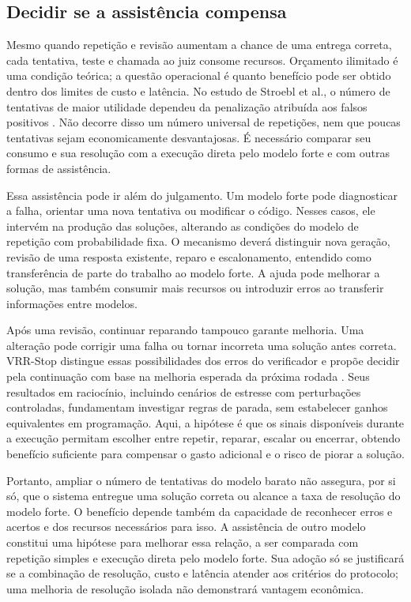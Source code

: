 \subsection{Decidir se a assistência compensa}

Mesmo quando repetição e revisão aumentam a chance de uma entrega correta, cada tentativa, teste e chamada ao juiz consome recursos. Orçamento ilimitado é uma condição teórica; a questão operacional é quanto benefício pode ser obtido dentro dos limites de custo e latência. No estudo de Stroebl et al., o número de tentativas de maior utilidade dependeu da penalização atribuída aos falsos positivos \cite{Stroebl2026Resampling}. Não decorre disso um número universal de repetições, nem que poucas tentativas sejam economicamente desvantajosas. É necessário comparar seu consumo e sua resolução com a execução direta pelo modelo forte e com outras formas de assistência.

Essa assistência pode ir além do julgamento. Um modelo forte pode diagnosticar a falha, orientar uma nova tentativa ou modificar o código. Nesses casos, ele intervém na produção das soluções, alterando as condições do modelo de repetição com probabilidade fixa. O mecanismo deverá distinguir nova geração, revisão de uma resposta existente, reparo e escalonamento, entendido como transferência de parte do trabalho ao modelo forte. A ajuda pode melhorar a solução, mas também consumir mais recursos ou introduzir erros ao transferir informações entre modelos.

Após uma revisão, continuar reparando tampouco garante melhoria. Uma alteração pode corrigir uma falha ou tornar incorreta uma solução antes correta. VRR-Stop distingue essas possibilidades dos erros do verificador e propõe decidir pela continuação com base na melhoria esperada da próxima rodada \cite{Wu2026VRRStop}. Seus resultados em raciocínio, incluindo cenários de estresse com perturbações controladas, fundamentam investigar regras de parada, sem estabelecer ganhos equivalentes em programação. Aqui, a hipótese é que os sinais disponíveis durante a execução permitam escolher entre repetir, reparar, escalar ou encerrar, obtendo benefício suficiente para compensar o gasto adicional e o risco de piorar a solução.

Portanto, ampliar o número de tentativas do modelo barato não assegura, por si só, que o sistema entregue uma solução correta ou alcance a taxa de resolução do modelo forte. O benefício depende também da capacidade de reconhecer erros e acertos e dos recursos necessários para isso. A assistência de outro modelo constitui uma hipótese para melhorar essa relação, a ser comparada com repetição simples e execução direta pelo modelo forte. Sua adoção só se justificará se a combinação de resolução, custo e latência atender aos critérios do protocolo; uma melhoria de resolução isolada não demonstrará vantagem econômica.


